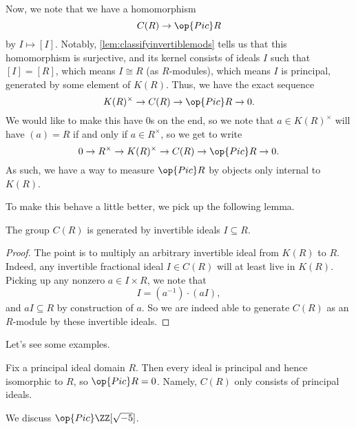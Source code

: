 Now, we note that we have a homomorphism
\[C(R)\to\op{Pic}R\]
by $I\mapsto[I]$. Notably, \autoref{lem:classifyinvertiblemods} tells us that this homomorphism is surjective, and its kernel consists of ideals $I$ such that $[I]=[R]$, which means $I\cong R$ (as $R$-modules), which means $I$ is principal, generated by some element of $K(R)$. Thus, we have the exact sequence
\[K(R)^\times\to C(R)\to\op{Pic}R\to0.\]
We would like to make this have $0$s on the end, so we note that $a\in K(R)^\times$ will have $(a)=R$ if and only if $a\in R^\times$, so we get to write
\[0\to R^\times\to K(R)^\times\to C(R)\to\op{Pic}R\to0.\]
As such, we have a way to measure $\op{Pic}R$ by objects only internal to $K(R)$.

To make this behave a little better, we pick up the following lemma.
\begin{lemma}
	The group $C(R)$ is generated by invertible ideals $I\subseteq R$.
\end{lemma}
\begin{proof}
	The point is to multiply an arbitrary invertible ideal from $K(R)$ to $R$. Indeed, any invertible fractional ideal $I\in C(R)$ will at least live in $K(R)$. Picking up any nonzero $a\in I\times R$, we note that
	\[I=\left(a^{-1}\right)\cdot(aI),\]
	and $aI\subseteq R$ by construction of $a$. So we are indeed able to generate $C(R)$ as an $R$-module by these invertible ideals.
\end{proof}
Let's see some examples.
\begin{example}
	Fix a principal ideal domain $R$. Then every ideal is principal and hence isomorphic to $R$, so $\op{Pic}R=0$. Namely, $C(R)$ only consists of principal ideals.
\end{example}
\begin{exe}
	We discuss $\op{Pic}\ZZ[\sqrt{-5}]$.
\end{exe}
